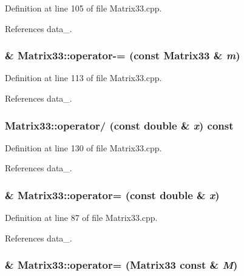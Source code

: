 Definition at line 105 of file Matrix33.cpp.



References data\_\-.

\subsubsection[{operator-\/=}]{ \& Matrix33::operator-\/= (const {\bf Matrix33} \& {\em m})}\label{classMatrix33_ac00458342245fbc74a35c8b486e4bdce}


Definition at line 113 of file Matrix33.cpp.



References data\_\-.

\subsubsection[{operator/}]{ Matrix33::operator/ (const double \& {\em x}) const}\label{classMatrix33_a637a80860f3d39dcc8b7d7110891d5b4}


Definition at line 130 of file Matrix33.cpp.



References data\_\-.

\subsubsection[{operator=}]{ \& Matrix33::operator= (const double \& {\em x})}\label{classMatrix33_a3e31a5aca7eec3b0ff5cd288f59b4b2e}


Definition at line 87 of file Matrix33.cpp.



References data\_\-.

\subsubsection[{operator=}]{ \& Matrix33::operator= ({\bf Matrix33} const \& {\em M})}\label{classMatrix33_a8ccac0dc2c3d499ee0a1dded37f2e013}


